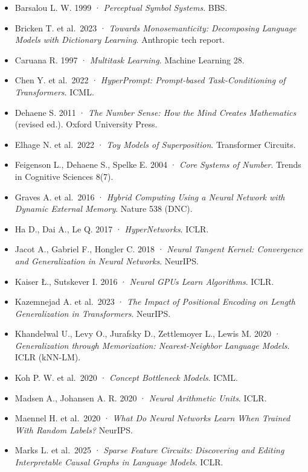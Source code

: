\begin{itemize}
\tightlist
\item
  Barsalou L. W. 1999 · \emph{Perceptual Symbol Systems}. BBS.
\item
  Bricken T. et al.~2023 · \emph{Towards Monosemanticity: Decomposing
  Language Models with Dictionary Learning}. Anthropic tech report.
\item
  Caruana R. 1997 · \emph{Multitask Learning}. Machine Learning 28.
\item
  Chen Y. et al.~2022 · \emph{HyperPrompt: Prompt-based Task-Conditioning
  of Transformers}. ICML.
\item
  Dehaene S. 2011 · \emph{The Number Sense: How the Mind Creates
  Mathematics} (revised ed.). Oxford University Press.
\item
  Elhage N. et al.~2022 · \emph{Toy Models of Superposition}.
  Transformer Circuits.
\item
  Feigenson L., Dehaene S., Spelke E. 2004 · \emph{Core Systems of Number}.
  Trends in Cognitive Sciences 8(7).
\item
  Graves A. et al.~2016 · \emph{Hybrid Computing Using a Neural Network
  with Dynamic External Memory}. Nature 538 (DNC).
\item
  Ha D., Dai A., Le Q. 2017 · \emph{HyperNetworks}. ICLR.
\item
  Jacot A., Gabriel F., Hongler C. 2018 · \emph{Neural Tangent Kernel:
  Convergence and Generalization in Neural Networks}. NeurIPS.
\item
  Kaiser Ł., Sutskever I. 2016 · \emph{Neural GPUs Learn Algorithms}.
  ICLR.
\item
  Kazemnejad A. et al.~2023 · \emph{The Impact of Positional Encoding on
  Length Generalization in Transformers}. NeurIPS.
\item
  Khandelwal U., Levy O., Jurafsky D., Zettlemoyer L., Lewis M.
  2020 · \emph{Generalization through Memorization: Nearest-Neighbor
  Language Models}. ICLR (kNN-LM).
\item
  Koh P. W. et al.~2020 · \emph{Concept Bottleneck Models}. ICML.
\item
  Madsen A., Johansen A. R. 2020 · \emph{Neural Arithmetic Units}. ICLR.
\item
  Maennel H. et al.~2020 · \emph{What Do Neural Networks Learn When
  Trained With Random Labels?} NeurIPS.
\item
  Marks L. et al.~2025 · \emph{Sparse Feature Circuits: Discovering and
  Editing Interpretable Causal Graphs in Language Models}. ICLR.

\end{itemize}
